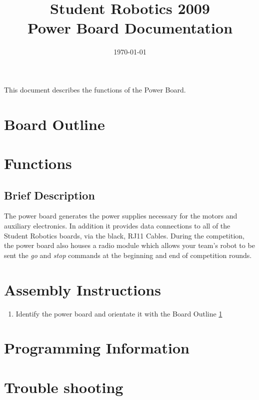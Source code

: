\documentclass[a4paper, 12pt]{article}
\title {Student Robotics 2009\\ Power Board Documentation}
\date{\today}
\begin{document}
\maketitle

\noindent This document describes the functions of the Power Board. 

\section{Board Outline}
\label{sec:outline}

\section{Functions}
\subsection{Brief Description}
The power board generates the power supplies necessary for the motors and auxiliary electronics. In addition it provides data connections to all of the Student Robotics boards, via the black, RJ11 Cables. During the competition, the power board also houses a radio module which allows your team's robot to be sent the \textit{go} and \textit{stop} commands at the beginning and end of competition rounds.

\section{Assembly Instructions}
\begin{enumerate}
\item 	Identify the power board and orientate it with the Board Outline \ref{sec:outline}
\end{enumerate} 
\section{Programming Information}

\section{Trouble shooting}
\end{document}
